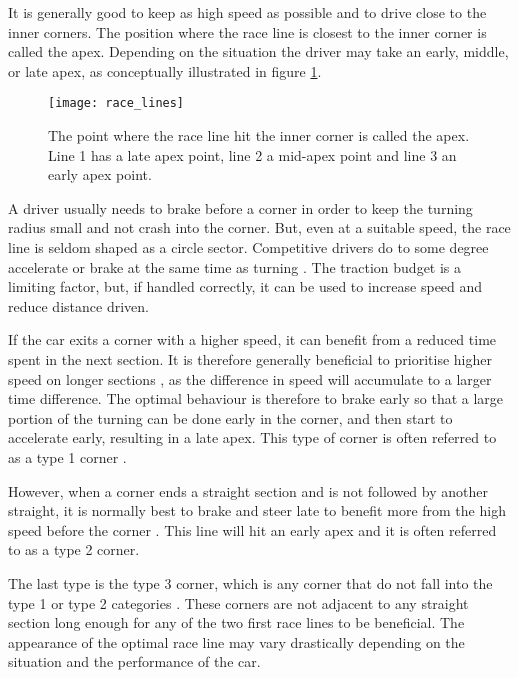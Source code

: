 It is generally good to keep as high speed as possible and to drive close to the inner corners. The position where the race line is closest to the inner corner is called the apex. Depending on the situation the driver may take an early, middle, or late apex, as conceptually illustrated in figure \ref{figure:apex_variants}.

\begin{figure}[H]
    \centering
    \texttt{[image: race\_lines]}
    \caption{The point where the race line hit the inner corner is called the apex. Line 1 has a late apex point, line 2 a mid-apex point and line 3 an early apex point.}
    \label{figure:apex_variants}
\end{figure}

\noindent
A driver usually needs to brake before a corner in order to keep the turning radius small and not crash into the corner. But, even at a suitable speed, the race line is seldom shaped as a circle sector. Competitive drivers do to some degree accelerate or brake at the same time as turning \cite{edmondson}. The traction budget is a limiting factor, but, if handled correctly, it can be used to increase speed and reduce distance driven. 

If the car exits a corner with a higher speed, it can benefit from a reduced time spent in the next section. It is therefore generally beneficial to prioritise higher speed on longer sections \cite{beckman, edmondson}, as the difference in speed will accumulate to a larger time difference. The optimal behaviour is therefore to brake early so that a large portion of the turning can be done early in the corner, and then start to accelerate early, resulting in a late apex. This type of corner is often referred to as a type 1 corner \cite{edmondson}.

However, when a corner ends a straight section and is not followed by another straight, it is normally best to brake and steer late to benefit more from the high speed before the corner \cite{edmondson}. This line will hit an early apex and it is often referred to as a type 2 corner.

The last type is the type 3 corner, which is any corner that do not fall into the type 1 or type 2 categories \cite{edmondson}. These corners are not adjacent to any straight section long enough for any of the two first race lines to be beneficial. The appearance of the optimal race line may vary drastically depending on the situation and the performance of the car.

